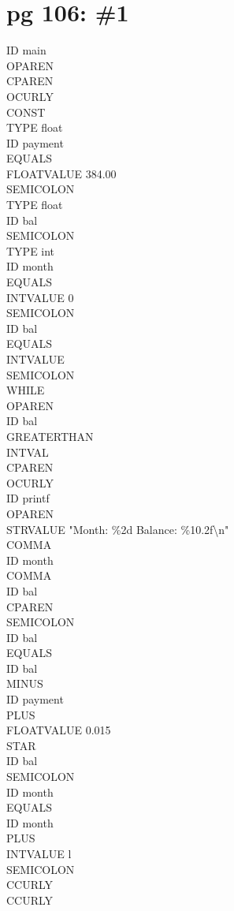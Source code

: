 \documentclass[11pt]{article}
\begin{document}
\section{pg 106: \#1}
    ID main \\
    OPAREN \\
    CPAREN \\
    OCURLY \\
    CONST \\
    TYPE float \\
    ID payment \\
    EQUALS \\
    FLOATVALUE 384.00 \\
    SEMICOLON \\
    TYPE float \\
    ID bal \\
    SEMICOLON \\
    TYPE int \\
    ID month \\
    EQUALS \\
    INTVALUE 0 \\
    SEMICOLON \\
    ID bal \\
    EQUALS \\
    INTVALUE \\
    SEMICOLON \\
    WHILE \\
    OPAREN \\
    ID bal \\
    GREATERTHAN \\
    INTVAL \\
    CPAREN \\
    OCURLY \\
    ID printf \\
    OPAREN \\
    STRVALUE "Month: \%2d Balance: \%10.2f\textbackslash n" \\
    COMMA \\
    ID month \\
    COMMA \\
    ID bal \\
    CPAREN \\
    SEMICOLON \\
    ID bal \\
    EQUALS \\
    ID bal \\
    MINUS \\
    ID payment \\
    PLUS \\
    FLOATVALUE 0.015 \\
    STAR \\
    ID bal \\
    SEMICOLON \\
    ID month \\
    EQUALS \\
    ID month \\
    PLUS \\
    INTVALUE l \\
    SEMICOLON \\
    CCURLY \\
    CCURLY \\
\end{document}
